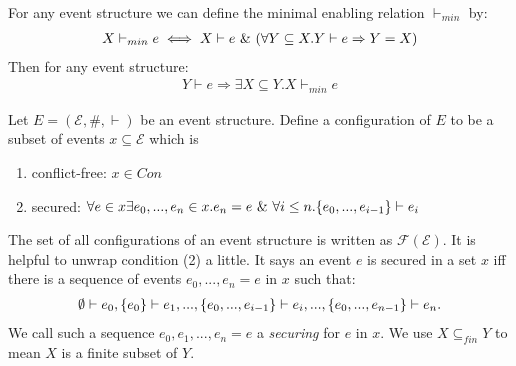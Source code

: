 \documentclass{article}
\begin{document}
\begin{notion}
    For any event structure we can define the minimal enabling relation $\vdash_{min}$ by:
    \begin{align*}
        X \vdash_{min} e \iff X \vdash e \ \& \ 
        ( \forall Y \subseteq X . Y \vdash e \Rightarrow Y = X )
    \end{align*}
    Then for any event structure:
    \begin{align*}
        Y \vdash e \Rightarrow \exists X \subseteq Y . X \vdash_{min} e
    \end{align*}
\end{notion}

\begin{definition}[Configuration]
    \label{conf}
    Let $E = (\mathcal{E},\#,\vdash)$ be an event structure.
    Define a configuration of $E$ to be a subset of events $x \subseteq \mathcal{E}$ which is
    \begin{enumerate}
        \item conflict-free: $x \in Con$
        \item secured: $\forall e \in x \exists e_0,...,e_n \in x. e_n = e \ \& \
                  \forall i \leq n. \{e_0,...,e_{i-1}\} \vdash e_i$
    \end{enumerate}
\end{definition}
The set of all configurations of an event structure is written as $\mathcal{F(E)}$.
It is helpful to unwrap condition (2) a little. It says an event $e$ is secured in a set $x$
iff there is a sequence of events $e_0,...,e_n = e$ in $x$ such that:
\begin{align*}
    \emptyset \vdash e_0, \{e_0\} \vdash e_1, ..., \{e_0,...,e_{i-1}\} \vdash e_i,...,
    \{e_0,...,e_{n-1}\} \vdash e_n.
\end{align*}
We call such a sequence $e_0,e_1,...,e_n = e$ a \emph{securing} for $e$ in $x$.
We use $X \subseteq_{fin} Y$ to mean $X$ is a finite subset of $Y$.
\end{document}
